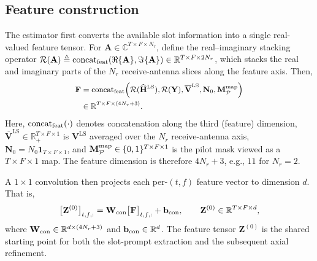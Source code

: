 \documentclass[conference,letterpaper]{IEEEtran}
\begin{document}
	\subsection{Feature construction}
	\label{subsec:features}
	The estimator first converts the available slot information into a single
	real-valued feature tensor. For
	$\mathbf{A}\in\mathbb{C}^{T\times F\times N_r}$, define the
	real--imaginary stacking operator
	$\mathcal{R}(\mathbf{A})
	\triangleq
	\operatorname{concat}_{\rm feat}(\Re\{\mathbf{A}\},\Im\{\mathbf{A}\})
	\in\mathbb{R}^{T\times F\times 2N_r}$,
	which stacks the real and imaginary parts of the $N_r$ receive-antenna
	slices along the feature axis. Then,
	\begin{equation}
		\small
		\label{eq:feature_tensor}
		\begin{aligned}
			\mathbf{F}
			&=
			\operatorname{concat}_{\rm feat}\!\left(
			\mathcal{R}(\widehat{\mathbf{H}}^{\mathrm{LS}}),
			\mathcal{R}(\mathbf{Y}),
			\overline{\mathbf{V}}^{\mathrm{LS}},
			\mathbf{N}_0,
			\mathbf{M}_{\mathcal{P}}^{\rm map}
			\right) \\
			&\in
			\mathbb{R}^{T\times F\times(4N_r+3)} .
		\end{aligned}
	\end{equation}
	Here, $\operatorname{concat}_{\rm feat}(\cdot)$ denotes concatenation along the third (feature) dimension, $\overline{\mathbf{V}}^{\mathrm{LS}}\in\mathbb{R}_{+}^{T\times F\times 1}$ is $\mathbf{V}^{\mathrm{LS}}$ averaged over the $N_r$ receive-antenna axis, $\mathbf{N}_0=N_0\mathbf{1}_{T\times F\times 1}$, and $\mathbf{M}_{\mathcal{P}}^{\rm map}\in\{0,1\}^{T\times F\times 1}$ is the pilot mask viewed as a $T\times F\times 1$ map. The feature dimension is therefore $4N_r+3$, e.g., $11$ for $N_r=2$.
	
	A $1\times1$ convolution then projects each per-$(t,f)$ feature vector to dimension $d$. That is,
	\begin{equation}
		\label{eq:stem}
		\big[\mathbf{Z}^{(0)}\big]_{t,f,:}
		=
		\mathbf{W}_{\rm con}
		\big[\mathbf{F}\big]_{t,f,:}
		+
		\mathbf{b}_{\rm con},
		\qquad
		\mathbf{Z}^{(0)}\in\mathbb{R}^{T\times F\times d},
	\end{equation}
	where
	$\mathbf{W}_{\rm con}\in\mathbb{R}^{d\times(4N_r+3)}$
	and
	$\mathbf{b}_{\rm con}\in\mathbb{R}^{d}$.
	The feature tensor $\mathbf{Z}^{(0)}$ is the shared starting point for both the slot-prompt extraction and the subsequent axial refinement.
	\vspace{-.2cm}
\end{document}
